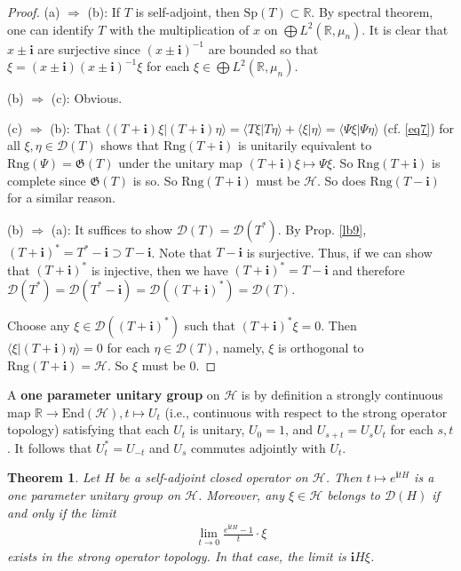 \documentclass[12pt,a4paper,notitlepage]{article}
\theoremstyle{definition}
\theoremstyle{plain}
\newtheorem{thm}[df]{Theorem}
\newcommand{\fk}{\mathfrak}
\newcommand{\mc}{\mathcal}
\newcommand{\End}{\mathrm{End}} %
\newcommand{\Dom}{\scr D}
\newcommand{\bk}[1]{\langle {#1}\rangle}
\newcommand{\scr}{\mathscr}
\newcommand{\im}{\mathbf{i}}
\newcommand{\Rbb}{\mathbb R}
\newcommand{\Sp}{\mathrm{Sp}}
\newcommand{\Rng}{\mathrm{Rng}}
\numberwithin{equation}{section}
\begin{document}
\begin{proof}
(a) $\Rightarrow$ (b): If $T$ is self-adjoint, then $\Sp(T)\subset \Rbb$. By spectral theorem, one can identify $T$ with the multiplication of $x$ on $\bigoplus L^2(\Rbb,\mu_n)$. It is clear that $x\pm\im$ are surjective since $(x\pm\im)^{-1}$ are bounded so that $\xi=(x\pm\im)(x\pm\im)^{-1}\xi$ for each $\xi\in \bigoplus L^2(\Rbb,\mu_n)$.

(b) $\Rightarrow$ (c): Obvious.

(c) $\Rightarrow$ (b): That $\bk{(T+\im)\xi|(T+\im)\eta}=\bk{T\xi|T\eta}+\bk{\xi|\eta}=\bk{\Psi\xi|\Psi\eta}$ (cf. \eqref{eq7}) for all $\xi,\eta\in\Dom(T)$ shows that $\Rng(T+\im)$ is unitarily equivalent to $\Rng(\Psi)=\fk G(T)$ under the unitary map $(T+\im)\xi\mapsto \Psi\xi$. So $\Rng(T+\im)$ is complete since $\fk G(T)$ is so. So $\Rng(T+\im)$ must be $\mc H$. So does $\Rng(T-\im)$ for a similar reason.

(b) $\Rightarrow$ (a): It suffices to show $\Dom(T)=\Dom(T^*)$. By Prop. \ref{lb9}, $(T+\im)^*=T^*-\im\supset T-\im$. Note that $T-\im$ is surjective. Thus, if we can show that $(T+\im)^*$ is injective, then we have $(T+\im)^*=T-\im$ and therefore $\Dom(T^*)=\Dom(T^*-\im)=\Dom((T+\im)^*)=\Dom(T)$.

Choose any $\xi\in\Dom((T+\im)^*)$ such that $(T+\im)^*\xi=0$. Then $\bk{\xi|(T+\im)\eta}=0$ for each $\eta\in\Dom(T)$, namely, $\xi$ is orthogonal to $\Rng(T+\im)=\mc H$. So $\xi$ must be $0$.
\end{proof}


A \textbf{one parameter unitary group} on $\mc H$ is by definition a strongly continuous map $\Rbb\rightarrow\End(\mc H),t\mapsto U_t$ (i.e., continuous with respect to the strong operator topology) satisfying that each $U_t$ is unitary, $U_0=1$, and $U_{s+t}=U_sU_t$ for each $s,t$. It follows that $U_t^*=U_{-t}$ and $U_s$ commutes adjointly with $U_t$.


\begin{thm}
Let $H$ be a self-adjoint closed operator on $\mc H$. Then $t\mapsto e^{\im tH}$ is a one parameter unitary group on $\mc H$. Moreover, any $\xi\in\mc H$ belongs to $\Dom(H)$ if and only if the limit
\begin{align}
\lim_{t\rightarrow 0}\frac{e^{\im tH}-1}{t}\cdot \xi\label{eq17}	
\end{align}
exists in the strong operator topology. In that case, the limit is $\im H\xi$.
\end{thm}
\end{document}
